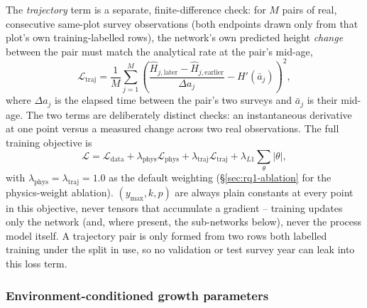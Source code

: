 The \emph{trajectory} term is a separate, finite-difference check: for $M$ pairs of real,
consecutive same-plot survey observations (both endpoints drawn only from that plot's own
training-labelled rows), the network's own predicted height \emph{change} between the pair must
match the analytical rate at the pair's mid-age,
\begin{equation}
\mathcal{L}_{\text{traj}} = \frac{1}{M}\sum_{j=1}^{M}\left(\frac{\hat H_{j,\text{later}} -
\hat H_{j,\text{earlier}}}{\Delta a_j} - H'(\bar a_j)\right)^2,
\label{eq:trajectory-loss}
\end{equation}
where $\Delta a_j$ is the elapsed time between the pair's two surveys and $\bar a_j$ is their
mid-age. The two terms are deliberately distinct checks: an instantaneous derivative at one point
versus a measured change across two real observations. The full training objective is
\begin{equation}
\mathcal{L} = \mathcal{L}_{\text{data}} + \lambda_{\text{phys}}\mathcal{L}_{\text{phys}} +
\lambda_{\text{traj}}\mathcal{L}_{\text{traj}} + \lambda_{L1}\sum_{\theta}|\theta|,
\label{eq:total-loss}
\end{equation}
with $\lambda_{\text{phys}}=\lambda_{\text{traj}}=1.0$ as the default weighting
(\S\ref{sec:rq1-ablation} for the physics-weight ablation). $(y_{\max},k,p)$ are always plain
constants at every point in this objective, never tensors that accumulate a gradient -- training
updates only the network (and, where present, the sub-networks below), never the process model
itself. A trajectory pair is only formed from two rows both labelled training under the split in
use, so no validation or test survey year can leak into this loss term.

\subsubsection{Environment-conditioned growth parameters}
\label{sec:rq1-pinn-env}

